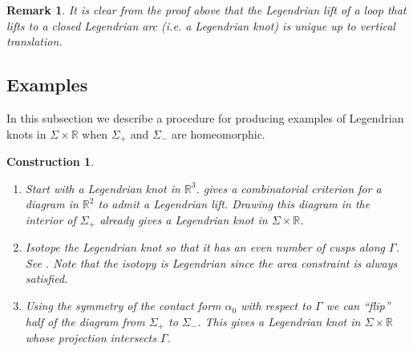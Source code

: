 \documentclass[11pt]{amsart}
\theoremstyle{mystyle}
\newtheorem{remark}[remark]{Remark}
\newtheorem{construction}[construction]{Construction}
\newcommand{\R}{\mathbb{R}}
\newcommand{\de}{\text{d}}
\newcommand{\<}{\langle}
\renewcommand{\>}{\rangle}
\begin{document}

\begin{remark}
    It is clear from the proof above that the Legendrian lift of a loop that lifts to a closed Legendrian arc (i.e. a Legendrian knot) is unique up to vertical translation.
\end{remark}

\subsection{Examples}\label{subsec:examplesOfLegendrians} \text{ }

In this subsection we describe a procedure for producing examples of Legendrian knots in $\Sigma \times \R$ when $\Sigma_+$ and $ \Sigma_-$ are homeomorphic.

\begin{construction}\vphantom{}\label{LegConstr}
    \begin{enumerate}[leftmargin=3.5em]
        \item[\textit{Step 1:}] Start with a Legendrian knot in $\R^3$. \cite[Corollary 11.3]{chekanov2002dga} gives a combinatorial criterion for a diagram in $\R^2$ to admit a Legendrian lift. Drawing this diagram in the interior of $\Sigma_+$ already gives a Legendrian knot in $\Sigma \times \R$. 
        \item[\textit{Step 2:}] Isotope the Legendrian knot so that it has an even number of cusps along $\Gamma$. See . Note that the isotopy is Legendrian since the area constraint is always satisfied.
        \item[\textit{Step 3:}] Using the symmetry of the contact form $\alpha_0$ with respect to $\Gamma$ we can ``flip'' half of the diagram from $\Sigma_+$ to $\Sigma_-$. This gives a Legendrian knot in $\Sigma \times \R$ whose projection intersects $\Gamma$.
    \end{enumerate}
\end{construction}
\end{document}
